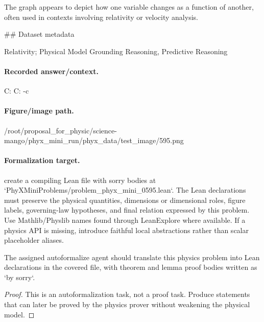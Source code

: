 The graph appears to depict how one variable changes as a function of another, often used in contexts involving relativity or velocity analysis.

\#\# Dataset metadata

Relativity; Physical Model Grounding Reasoning, Predictive Reasoning

\paragraph{Recorded answer/context.}
C: C: -c

\paragraph{Figure/image path.}
/root/proposal\_for\_physic/science-mango/phyx\_mini\_run/phyx\_data/test\_image/595.png

\paragraph{Formalization target.}
create a compiling Lean file with sorry bodies at `PhyXMiniProblems/problem\_phyx\_mini\_0595.lean`. The Lean declarations must preserve the physical quantities, dimensions or dimensional roles, figure labels, governing-law hypotheses, and final relation expressed by this problem.
Use Mathlib/Physlib names found through LeanExplore where available. If a physics API is missing, introduce faithful local abstractions rather than scalar placeholder aliases.

\begin{theorem}
\label{thm:physics:phyx_mini_0595:target}
The assigned autoformalize agent should translate this physics problem into Lean declarations in the covered file, with theorem and lemma proof bodies written as `by sorry`.
\end{theorem}
\begin{proof}
This is an autoformalization task, not a proof task. Produce statements that can later be proved by the physics prover without weakening the physical model.
\end{proof}


